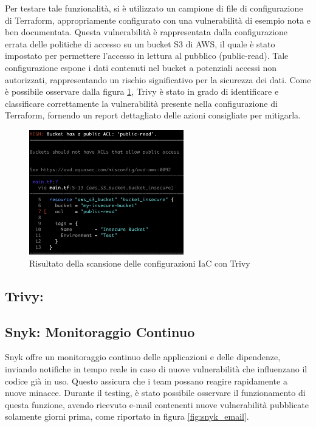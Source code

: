 Per testare tale funzionalità, si è utilizzato un campione di file di configurazione di Terraform, appropriamente configurato con una vulnerabilità di esempio nota e ben documentata. Questa vulnerabilità è rappresentata dalla configurazione errata delle politiche di accesso su un bucket S3 di AWS, il quale è stato impostato per permettere l'accesso in lettura al pubblico (public-read). Tale configurazione espone i dati contenuti nel bucket a potenziali accessi non autorizzati, rappresentando un rischio significativo per la sicurezza dei dati.
Come è possibile osservare dalla figura \ref{fig:trivy_iac}, Trivy è stato in grado di identificare e classificare correttamente la vulnerabilità presente nella configurazione di Terraform, fornendo un report dettagliato delle azioni consigliate per mitigarla.
\begin{figure}[H]
   \centering
   \includegraphics[width=0.6\textwidth]{immagini/capitolo2/trivy_iac.png}
   \caption{Risultato della scansione delle configurazioni IaC con Trivy}
   \label{fig:trivy_iac}
\end{figure}
\subsection{Trivy:}

\subsection{Snyk: Monitoraggio Continuo}
Snyk offre un monitoraggio continuo delle applicazioni e delle dipendenze, inviando notifiche in tempo reale in caso di nuove vulnerabilità che influenzano il codice già in uso. Questo assicura che i team possano reagire rapidamente a nuove minacce. Durante il testing, è stato possibile osservare il funzionamento di questa funzione, avendo ricevuto e-mail contenenti nuove vulnerabilità pubblicate solamente giorni prima, come riportato in figura \ref{fig:snyk_email}.

